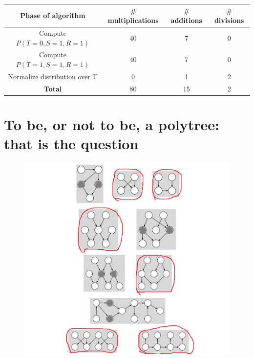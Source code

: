 \documentclass[11]{article}
\begin{document}
\begin{enumerate}[label=(\alph*)]
\begin{table}[htp]
\centering
\begin{tabular}{|c|c|c|c|}
\hline
\textbf{Phase of algorithm}   & \textbf{\# multiplications} & \textbf{\# additions} & \textbf{\# divisions} \\ \hline
Compute $P(T=0,S=1,R=1)$      & 40                         & 7                    & 0                    \\ \hline
Compute $P(T=1,S=1,R=1)$      & 40                         & 7                    & 0                    \\ \hline
Normalize distribution over T & 0                          & 1                    & 2                    \\ \hline
\textbf{Total}                & 80                         & 15                   & 2                    \\ \hline
\end{tabular}
\end{table}
\end{enumerate}
\pagebreak

\section{To be, or not to be, a polytree: that is the question}

\begin{figure}[htp]
  \includegraphics[width=\linewidth]{Polytrees.png}
\end{figure}
\pagebreak
\end{document}
